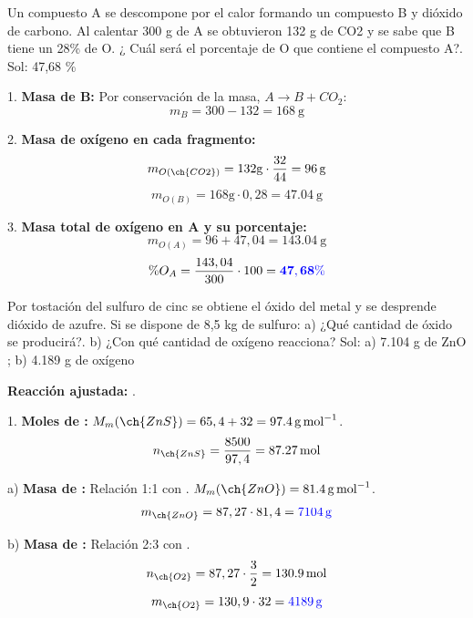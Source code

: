 \begin{exercise}
    Un compuesto A se descompone por el calor formando un compuesto B y dióxido de carbono. Al calentar 300 g de A se obtuvieron 132 g de CO2 y se sabe que B tiene un 28\%  de O. ¿ Cuál será el porcentaje de O que contiene el compuesto A?. Sol: 47,68 \%
    \begin{solu}
        1. \textbf{Masa de B:} Por conservación de la masa, $A \rightarrow B + CO_2$:
        \[ m_B = 300 - 132 = \qty{168}{\g} \]

        2. \textbf{Masa de oxígeno en cada fragmento:}
        \[ m_{O(\ch{CO2})} = 132 \si{\g} \cdot \dfrac{32}{44} = \qty{96}{\g} \]
        \[ m_{O(B)} = 168 \si{\g} \cdot 0,28 = \qty{47,04}{\g} \]

        3. \textbf{Masa total de oxígeno en A y su porcentaje:}
        \[ m_{O(A)} = 96 + 47,04 = \qty{143,04}{\g} \]
        \[ \%O_A = \dfrac{143,04}{300} \cdot 100 = \mathbf{\textcolor{blue}{47,68 \%}} \]
    \end{solu}
\end{exercise}

\begin{exercise}
    Por tostación del sulfuro de cinc se obtiene el óxido del metal y se desprende dióxido de azufre. Si se dispone de 8,5 kg de sulfuro:
    a) ¿Qué cantidad de óxido se producirá?. b) ¿Con qué cantidad de oxígeno reacciona?
    Sol: a)  7.104 g de ZnO ; b) 4.189 g de oxígeno

    \begin{solu}
        \textbf{Reacción ajustada:} .

        1. \textbf{Moles de :} $M_m(\ch{ZnS}) = 65,4 + 32 = \qty{97,4}{\g\per\mol}$.
        \[ n_{\ch{ZnS}} = \dfrac{8500}{97,4} = \qty{87,27}{\mol} \]

        a) \textbf{Masa de :} Relación 1:1 con . $M_m(\ch{ZnO}) = \qty{81,4}{\g\per\mol}$.
        \[ m_{\ch{ZnO}} = 87,27 \cdot 81,4 = \mathbf{\textcolor{blue}{\qty{7104}{\g}}} \]

        b) \textbf{Masa de :} Relación 2:3 con .
        \[ n_{\ch{O2}} = 87,27 \cdot \dfrac{3}{2} = \qty{130,9}{\mol} \]
        \[ m_{\ch{O2}} = 130,9 \cdot 32 = \mathbf{\textcolor{blue}{\qty{4189}{\g}}} \]
    \end{solu}
\end{exercise}

